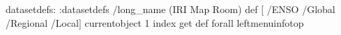 \begin{ingrid}
datasetdefs:
:datasetdefs
/long_name (IRI Map Room) def
[ /ENSO /Global /Regional /Local]
{ currentobject 1 index get  def} forall
leftmenuinfotop
\end{ingrid}